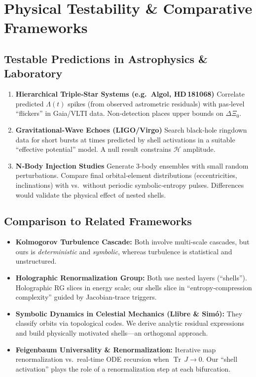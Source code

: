 \documentclass[11pt]{article}
\newcommand{\Contradiction}{\Xi}
\newcommand{\Leak}{\Lambda}
\newcommand{\Hgain}{\mathcal{H}}
\newcommand{\TrJ}{\operatorname{Tr}\,J}
\begin{document}
\section{Physical Testability \& Comparative Frameworks}

\subsection{Testable Predictions in Astrophysics \& Laboratory}
\begin{enumerate}[label=\textbf{\alph*)},itemsep=2pt]
  \item \textbf{Hierarchical Triple‐Star Systems (e.g.\ Algol, HD\,181068)}  
    Correlate predicted \(\Leak(t)\) spikes (from observed astrometric residuals) with µas‐level “flickers” in Gaia/VLTI data. Non‐detection places upper bounds on \(\Delta\Contradiction_0\).

  \item \textbf{Gravitational‐Wave Echoes (LIGO/Virgo)}  
    Search black‐hole ringdown data for short bursts at times predicted by shell activations in a suitable “effective potential” model. A null result constrains \(\Hgain\) amplitude.

  \item \textbf{N‐Body Injection Studies}  
    Generate 3‐body ensembles with small random perturbations. Compare final orbital‐element distributions (eccentricities, inclinations) with vs.\ without periodic symbolic‐entropy pulses. Differences would validate the physical effect of nested shells.
\end{enumerate}

\subsection{Comparison to Related Frameworks}
\begin{itemize}[leftmargin=*]
  \item \textbf{Kolmogorov Turbulence Cascade:} Both involve multi‐scale cascades, but ours is \emph{deterministic} and \emph{symbolic}, whereas turbulence is statistical and unstructured.
  \item \textbf{Holographic Renormalization Group:} Both use nested layers (“shells”). Holographic RG slices in energy scale; our shells slice in “entropy‐compression complexity” guided by Jacobian‐trace triggers.
  \item \textbf{Symbolic Dynamics in Celestial Mechanics (Llibre \& Simó):} They classify orbits via topological codes. We derive analytic residual expressions and build physically motivated shells—an orthogonal approach.
  \item \textbf{Feigenbaum Universality \& Renormalization:} Iterative map renormalization vs.\ real‐time ODE recursion when \(\TrJ \to 0\). Our “shell activation” plays the role of a renormalization step at each bifurcation.
\end{itemize}
\end{document}
